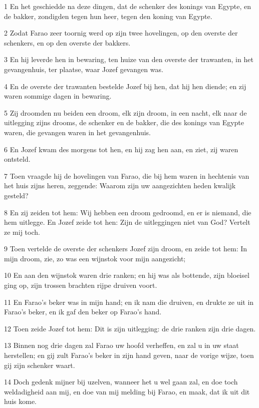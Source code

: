 \par 1 En het geschiedde na deze dingen, dat de schenker des konings van Egypte, en de bakker, zondigden tegen hun heer, tegen den koning van Egypte.
\par 2 Zodat Farao zeer toornig werd op zijn twee hovelingen, op den overste der schenkers, en op den overste der bakkers.
\par 3 En hij leverde hen in bewaring, ten huize van den overste der trawanten, in het gevangenhuis, ter plaatse, waar Jozef gevangen was.
\par 4 En de overste der trawanten bestelde Jozef bij hen, dat hij hen diende; en zij waren sommige dagen in bewaring.
\par 5 Zij droomden nu beiden een droom, elk zijn droom, in een nacht, elk naar de uitlegging zijns drooms, de schenker en de bakker, die des konings van Egypte waren, die gevangen waren in het gevangenhuis.
\par 6 En Jozef kwam des morgens tot hen, en hij zag hen aan, en ziet, zij waren ontsteld.
\par 7 Toen vraagde hij de hovelingen van Farao, die bij hem waren in hechtenis van het huis zijns heren, zeggende: Waarom zijn uw aangezichten heden kwalijk gesteld?
\par 8 En zij zeiden tot hem: Wij hebben een droom gedroomd, en er is niemand, die hem uitlegge. En Jozef zeide tot hen: Zijn de uitleggingen niet van God? Vertelt ze mij toch.
\par 9 Toen vertelde de overste der schenkers Jozef zijn droom, en zeide tot hem: In mijn droom, zie, zo was een wijnstok voor mijn aangezicht;
\par 10 En aan den wijnstok waren drie ranken; en hij was als bottende, zijn bloeisel ging op, zijn trossen brachten rijpe druiven voort.
\par 11 En Farao's beker was in mijn hand; en ik nam die druiven, en drukte ze uit in Farao's beker, en ik gaf den beker op Farao's hand.
\par 12 Toen zeide Jozef tot hem: Dit is zijn uitlegging: de drie ranken zijn drie dagen.
\par 13 Binnen nog drie dagen zal Farao uw hoofd verheffen, en zal u in uw staat herstellen; en gij zult Farao's beker in zijn hand geven, naar de vorige wijze, toen gij zijn schenker waart.
\par 14 Doch gedenk mijner bij uzelven, wanneer het u wel gaan zal, en doe toch weldadigheid aan mij, en doe van mij melding bij Farao, en maak, dat ik uit dit huis kome.

